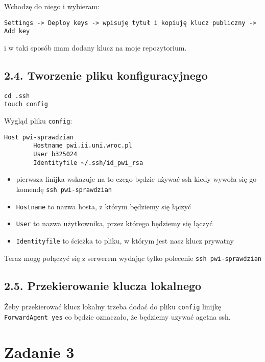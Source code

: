 \documentclass[a4paper, 11pt]{article}
\begin{document}
\noindent Wchodzę do niego i wybieram:
\begin{verbatim}
Settings -> Deploy keys -> wpisuję tytuł i kopiuję klucz publiczny -> Add key
\end{verbatim}
i w taki sposób mam dodany klucz na moje repozytorium.\\

\subsection*{2.4. Tworzenie pliku konfiguracyjnego}
\begin{verbatim}
cd .ssh
touch config
\end{verbatim}
Wygląd pliku \verb+config+:
\begin{verbatim}
Host pwi-sprawdzian
        Hostname pwi.ii.uni.wroc.pl
        User b325024
        Identityfile ~/.ssh/id_pwi_rsa
\end{verbatim}
\begin{itemize}
    \item pierwsza linijka wskazuje na to czego będzie używać ssh kiedy wywoła się go komendę \verb+ssh pwi-sprawdzian+
    \item \verb+Hostname+ to nazwa hosta, z którym będziemy się łączyć
    \item \verb+User+ to nazwa użytkownika, przez którego będziemy się łączyć
    \item \verb+Identityfile+ to ścieżka to pliku, w którym jest nasz klucz prywatny
\end{itemize}

Teraz mogę połączyć się z serwerem wydając tylko polecenie \verb+ssh pwi-sprawdzian+

\subsection*{2.5. Przekierowanie klucza lokalnego}
Żeby przekierować klucz lokalny trzeba dodać do pliku \verb+config+ linijkę \verb+ForwardAgent yes+ co będzie oznaczało, że będziemy uzywać agetna ssh.

\section*{Zadanie 3}
\end{document}
